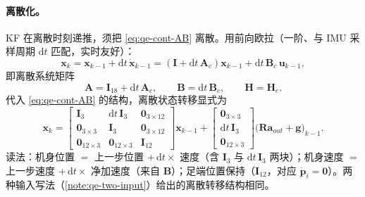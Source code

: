 \paragraph{离散化。}
KF 在离散时刻递推，须把 \cref{eq:qe-cont-AB} 离散。用前向欧拉（一阶、与 IMU 采样周期 $\mathrm{d}t$ 匹配，实时友好）\cite{unitree2023quadruped}：
\begin{equation}
  \boldsymbol x_k = \boldsymbol x_{k-1} + \mathrm{d}t\,\dot{\boldsymbol x}_{k-1}
  = (\mathbf{I}+\mathrm{d}t\,\mathbf{A}_c)\boldsymbol x_{k-1} + \mathrm{d}t\,\mathbf{B}_c\,\boldsymbol u_{k-1},
  \label{eq:qe-disc-step}
\end{equation}
即离散系统矩阵
\begin{equation}
  \boxed{\;\mathbf{A} = \mathbf{I}_{18} + \mathrm{d}t\,\mathbf{A}_c,\qquad \mathbf{B} = \mathrm{d}t\,\mathbf{B}_c,\qquad \mathbf{H} = \mathbf{H}_c.\;}
  \label{eq:qe-disc-AB}
\end{equation}
代入 \cref{eq:qe-cont-AB} 的结构，离散状态转移显式为
\begin{equation}
  \boldsymbol x_{k} =
  \begin{bmatrix} \mathbf{I}_3 & \mathrm{d}t\,\mathbf{I}_3 & \mathbf{0}_{3\times12}\\ \mathbf{0}_{3\times3} & \mathbf{I}_3 & \mathbf{0}_{3\times12}\\ \mathbf{0}_{12\times3} & \mathbf{0}_{12\times3} & \mathbf{I}_{12} \end{bmatrix}\boldsymbol x_{k-1}
  + \begin{bmatrix} \mathbf{0}_{3\times3}\\ \mathrm{d}t\,\mathbf{I}_3 \\ \mathbf{0}_{12\times3} \end{bmatrix}\big(\mathbf{R}\boldsymbol a_{out}+\boldsymbol g\big)_{k-1}.
  \label{eq:qe-disc-explicit}
\end{equation}
读法：机身位置 $=$ 上一步位置 $+\,\mathrm{d}t\times$ 速度（含 $\mathbf{I}_3$ 与 $\mathrm{d}t\,\mathbf{I}_3$ 两块）；机身速度 $=$ 上一步速度 $+\,\mathrm{d}t\times$ 净加速度（来自 $\mathbf{B}$）；足端位置保持（$\mathbf{I}_{12}$，对应 $\dot{\boldsymbol p}_i=\boldsymbol 0$）。两种输入写法（\cref{note:qe-two-input}）给出的离散转移结构相同。

